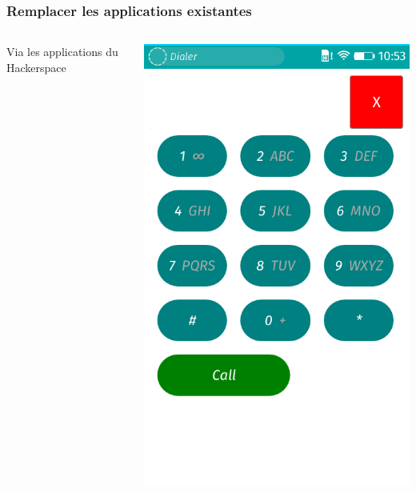 \documentclass{beamer}
\begin{document}
\begin{frame}
\frametitle{Remplacer les applications existantes}
\begin{columns}[T]
\begin{column}{5cm}
\begin{block}{Via les applications du Hackerspace}
\end{block} 
\end{column}
\begin{column}{5cm}
\includegraphics[scale=0.25] {./images/FFOS_Dialer.png} 
\end{column}
\end{columns}  
\end{frame}
\end{document}
